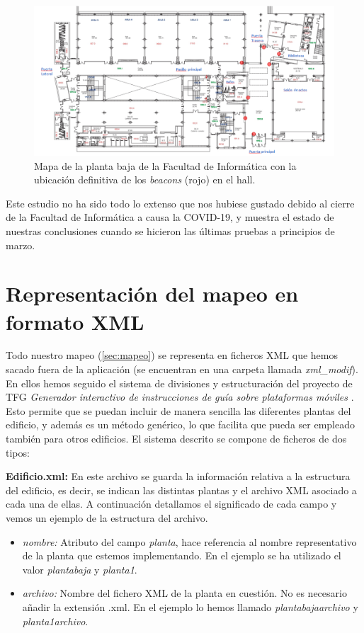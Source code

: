 \begin{figure}[t]
	\centering
	\includegraphics[width=1\textwidth]{Imagenes/Descripciondeltrabajo/beacons_plantabaja_final}
	\caption{Mapa de la planta baja de la Facultad de Informática con la ubicación definitiva de los \textit{beacons} (rojo) en el hall. }
	\label{fig:beaconsPBaja}
\end{figure}

Este estudio no ha sido todo lo extenso que nos hubiese gustado debido al cierre de la Facultad de Informática a causa la COVID-19, y muestra el estado de nuestras conclusiones cuando se hicieron las últimas pruebas a principios de marzo.

\section{Representación del mapeo en formato XML}
\label{sub:mapeo_xml}
Todo nuestro mapeo (\ref{sec:mapeo}) se representa en ficheros XML que hemos sacado fuera de la aplicación (se encuentran en una carpeta llamada \textit{xml\_modif}). En ellos hemos seguido el sistema de divisiones y estructuración del proyecto de TFG \textit{Generador interactivo de instrucciones de guía sobre plataformas móviles} \citep{TFGguia}. Esto permite que se puedan incluir
de manera sencilla las diferentes plantas del edificio, y además es un método genérico, lo que facilita que pueda ser empleado también para otros edificios. El sistema descrito se compone de ficheros de dos tipos:

\textbf{Edificio.xml:} En este archivo se guarda la información relativa a la estructura del edificio, es decir, se indican las distintas plantas y el archivo XML asociado a cada una de ellas. A continuación detallamos el significado de cada campo y vemos un ejemplo de la estructura del archivo.

\begin{itemize}
	\item \textit{nombre:} Atributo del campo \textit{planta}, hace referencia al nombre representativo de la planta que estemos implementando. En el ejemplo se ha utilizado el valor \textit{plantabaja} y \textit{planta1}.
	
	\item \textit{archivo:} Nombre del fichero XML de la planta en cuestión. No es necesario añadir la extensión .xml. En el ejemplo lo hemos llamado \textit{plantabajaarchivo} y \textit{planta1archivo}.
\end{itemize}

